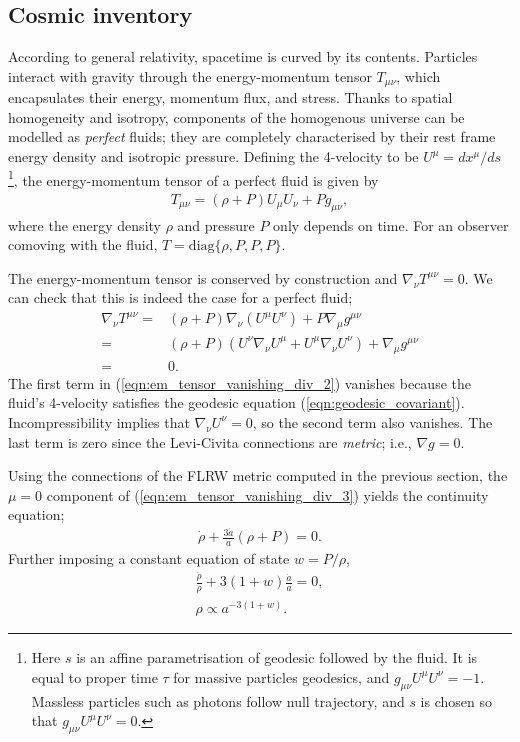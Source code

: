 \documentclass[a4paper,12pt,times,custombib,print,index]{Classes/PhDThesisPSnPDF} %
\begin{document}
\subsection{Cosmic inventory}

According to general relativity, spacetime is curved by its contents. Particles interact with gravity through the energy-momentum tensor $T_{\mu\nu}$, which encapsulates their energy, momentum flux, and stress. Thanks to spatial homogeneity and isotropy, components of the homogenous universe can be modelled as \textit{perfect} fluids; they are completely characterised by their rest frame energy density and isotropic pressure. Defining the 4-velocity to be $U^\mu = dx^\mu / ds$ \footnote{Here $s$ is an affine parametrisation of geodesic followed by the fluid. It is equal to proper time $\tau$ for massive particles geodesics, and $g_{\mu\nu}U^\mu U^\nu = -1$. Massless particles such as photons follow null trajectory, and $s$ is chosen so that $g_{\mu\nu}U^\mu U^\nu = 0$.}, the energy-momentum tensor of a perfect fluid is given by
\begin{align}
	T_{\mu\nu} = (\rho + P) U_\mu U_\nu + P g_{\mu\nu}, \label{eqn:em_tensor_perfect_fluid}
\end{align}
where the energy density $\rho$ and pressure $P$ only depends on time. For an observer comoving with the fluid, $T = \text{diag}\{\rho,P,P,P\}$.

The energy-momentum tensor is conserved by construction and $\nabla_\nu T^{\mu\nu} = 0$. We can check that this is indeed the case for a perfect fluid;
\begin{align}
	\nabla_\nu T^{\mu\nu} =& (\rho + P) \nabla_\nu \left( U^\mu U^\nu \right) + P \nabla_\mu g^{\mu\nu} \label{eqn:em_tensor_vanishing_div_1} \\
	=& (\rho + P) \left(  U^\nu \nabla_\nu U^\mu + U^\mu \nabla_\nu U^\nu \right) + \nabla_\mu g^{\mu\nu} \label{eqn:em_tensor_vanishing_div_2}\\
	=& 0. \label{eqn:em_tensor_vanishing_div_3}
\end{align}
The first term in (\ref{eqn:em_tensor_vanishing_div_2}) vanishes because the fluid's 4-velocity satisfies the geodesic equation (\ref{eqn:geodesic_covariant}). Incompressibility implies that $\nabla_\nu U^\nu = 0$, so the second term also vanishes. The last term is zero since the Levi-Civita connections are \textit{metric}; i.e., $\nabla g = 0$.

Using the connections of the FLRW metric computed in the previous section, the $\mu=0$ component of (\ref{eqn:em_tensor_vanishing_div_3}) yields the continuity equation;
\begin{align}
	\dot{\rho} + \frac{3\dot{a}}{a} \left( \rho + P \right) = 0. \label{eqn:continuity}
\end{align}
Further imposing a constant equation of state $w = P / \rho$, 
\begin{align}
	\frac{\dot{\rho}}{\rho} + 3(1+w) \frac{\dot{a}}{a} = 0, \\
	\rho \propto a^{-3(1+w)}. \label{eqn:energy_density_and_scale_factor}
\end{align}
\end{document}
